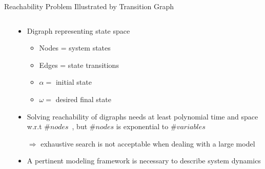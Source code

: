 \documentclass[8pt]{beamer}
\begin{document}
\begin{frame}{Reachability Problem Illustrated by Transition Graph}

\begin{columns}
\begin{column}{0.5\textwidth}
\centering
    
\end{column}
\begin{column}{0.5\textwidth}
\begin{itemize}
    \item Digraph representing state space
    \begin{itemize}
        \item Nodes = system states
        \item Edges = state transitions
        \item $\alpha=$ initial state
        \item $\omega=$ desired final state
    \end{itemize}
    \item<5->Solving reachability of digraphs needs at least polynomial time and space w.r.t $\#nodes$~\cite{harel2002complexity}, but $\#nodes$ is exponential to $\#variables$

    $\Longrightarrow$ exhaustive search is not acceptable when dealing with a large model
    \item <6-> A pertinent modeling framework is necessary to describe system dynamics
\end{itemize}

\end{column}
\end{columns}
    

    
\end{frame}
\end{document}

